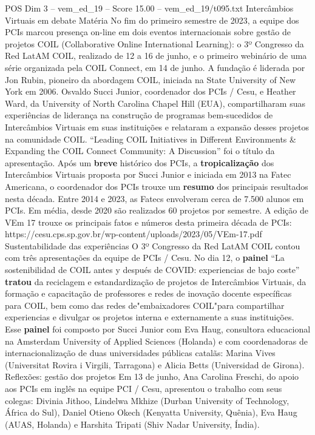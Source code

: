 \begin{textsample}{POS Dim 3 – vem\_ed\_19 – Score 15.00 – vem\_ed\_19/t095.txt}
Intercâmbios Virtuais em debate Matéria No fim do primeiro semestre de 2023, a equipe dos PCIs marcou presença on-line em dois eventos internacionais sobre gestão de projetos COIL (Collaborative Online International Learning): o 3º Congresso da Red LatAM COIL, realizado de 12 a 16 de junho, e o primeiro webinário de uma série organizada pela COIL Connect, em 14 de junho.
A fundação é liderada por Jon Rubin, pioneiro da abordagem COIL, iniciada na State University of New York em 2006.
Osvaldo Succi Junior, coordenador dos PCIs / Cesu, e Heather Ward, da University of North Carolina Chapel Hill (EUA), compartilharam suas experiências de liderança na construção de programas bem-sucedidos de Intercâmbios Virtuais em suas instituições e relataram a expansão desses projetos na comunidade COIL. “Leading COIL Initiatives in Different Environments \& Expanding the COIL Connect Community: A Discussion” foi o título da apresentação.
Após um \textbf{breve} histórico dos PCIs, a \textbf{tropicalização} dos Intercâmbios Virtuais proposta por Succi Junior e iniciada em 2013 na Fatec Americana, o coordenador dos PCIs trouxe um \textbf{resumo} dos principais resultados nesta década.
Entre 2014 e 2023, as Fatecs envolveram cerca de 7.500 alunos em PCIs.
Em média, desde 2020 são realizados 60 projetos por semestre.
A edição de VEm 17 trouxe os principais fatos e números desta primeira década de PCIs: https://cesu.cps.sp.gov.br/wp-content/uploads/2023/05/VEm-17.pdf Sustentabilidade das experiências O 3º Congresso da Red LatAM COIL contou com três apresentações da equipe de PCIs / Cesu.
No dia 12, o \textbf{painel} “La sostenibilidad de COIL antes y después de COVID: experiencias de bajo coste” \textbf{tratou} da reciclagem e estandardização de projetos de Intercâmbios Virtuais, da formação e capacitação de professores e redes de inovação docente específicas para COIL, bem como das redes de"embaixadores COIL"para compartilhar experiencias e divulgar os projetos interna e externamente a suas instituições.
Esse \textbf{painel} foi composto por Succi Junior com Eva Haug, consultora educacional na Amsterdam University of Applied Sciences (Holanda) e com coordenadoras de internacionalização de duas universidades públicas catalãs: Marina Vives (Universitat Rovira i Virgili, Tarragona) e Alicia Betts (Universidad de Girona).
Reflexões: gestão dos projetos Em 13 de junho, Ana Carolina Freschi, do apoio aos PCIs em inglês na equipe PCI / Cesu, apresentou o trabalho com seus colegas: Divinia Jithoo, Lindelwa Mkhize (Durban University of Technology, África do Sul), Daniel Otieno Okech (Kenyatta University, Quênia), Eva Haug (AUAS, Holanda) e Harshita Tripati (Shiv Nadar University, Índia).

\end{textsample}
